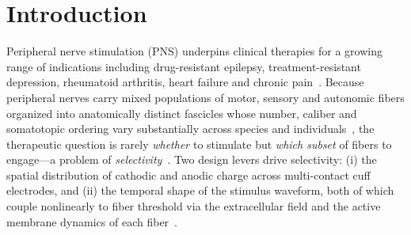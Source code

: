 \section{Introduction}
\label{sec:intro}

Peripheral nerve stimulation (PNS) underpins clinical therapies for a
growing range of indications including drug-resistant epilepsy,
treatment-resistant depression, rheumatoid arthritis, heart failure
and chronic pain~\cite{howland2014vns,koopman2016vns,bonaz2017vagus,deferrari2011cardiofit}.
Because peripheral nerves carry mixed populations of motor, sensory
and autonomic fibers organized into anatomically distinct fascicles
whose number, caliber and somatotopic ordering vary substantially
across species and individuals~\cite{settell2020vagotopy,pelot2023humanvagus},
the therapeutic question is rarely \emph{whether} to stimulate but
\emph{which subset} of fibers to engage---a problem of
\emph{selectivity}~\cite{aristovich2021,thompson2023spatially,musselman2023}.  Two design
levers drive selectivity: (i) the spatial distribution of cathodic
and anodic charge across multi-contact cuff electrodes, and (ii) the
temporal shape of the stimulus waveform, both of which couple
nonlinearly to fiber threshold via the extracellular
field and the active membrane dynamics of each
fiber~\cite{rattay1989analysis,grill1995stimulus,wongsarnpigoon2010energy}.

